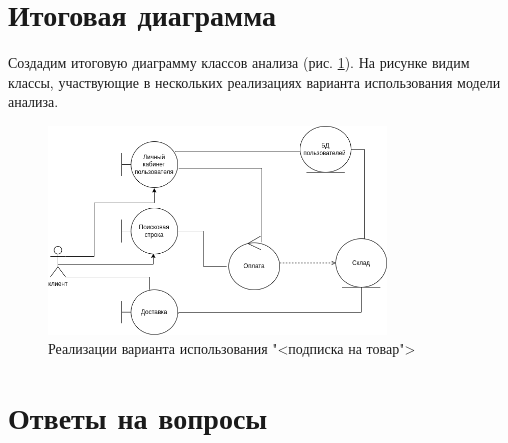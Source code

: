 \section{Итоговая диаграмма}
Создадим итоговую диаграмму классов анализа (рис. \ref{fig:complite}).
На рисунке видим классы, участвующие в нескольких реализациях варианта
использования модели анализа.
\begin{figure}[h!tp]
	\centering
	\includegraphics[width=0.8\textwidth]{uml_complite}
	\caption{Реализации варианта использования "<подписка на товар">}
	\label{fig:complite}
\end{figure}

\newpage

\section*{Ответы на вопросы}


